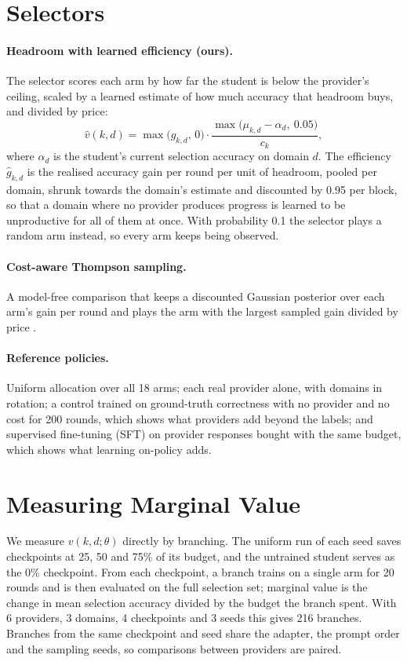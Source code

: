 \section{Selectors}
\label{pre:sec:selectors}

\paragraph{Headroom with learned efficiency (ours).} The selector scores each arm by how
far the student is below the provider's ceiling, scaled by a learned estimate of how much
accuracy that headroom buys, and divided by price:
\[
  \hat{v}(k, d) = \max\big(\hat{g}_{k,d},\, 0\big) \cdot
                  \frac{\max\big(\mu_{k,d} - \alpha_d,\ 0.05\big)}{c_k},
\]
where $\alpha_d$ is the student's current selection accuracy on domain $d$. The efficiency
$\hat{g}_{k,d}$ is the realised accuracy gain per round per unit of headroom, pooled per
domain, shrunk towards the domain's estimate and discounted by 0.95 per block, so that a
domain where no provider produces progress is learned to be unproductive for all of them at
once. With probability 0.1 the selector plays a random arm instead, so every arm keeps
being observed.

\paragraph{Cost-aware Thompson sampling.} A model-free comparison that keeps a discounted
Gaussian posterior over each arm's gain per round and plays the arm with the largest
sampled gain divided by price \autocite{xia_budgeted_ts_2015,raj_dts_2017}.

\paragraph{Reference policies.} Uniform allocation over all 18 arms; each real provider
alone, with domains in rotation; a control trained on ground-truth correctness with no
provider and no cost for 200 rounds, which shows what providers add beyond the labels; and
supervised fine-tuning (SFT) on provider responses bought with the same budget, which shows
what learning on-policy adds.

\section{Measuring Marginal Value}
\label{pre:sec:branching}

We measure $v(k, d; \theta)$ directly by branching. The uniform run of each seed saves
checkpoints at 25, 50 and 75\% of its budget, and the untrained student serves as the 0\%
checkpoint. From each checkpoint, a branch trains on a single arm for 20 rounds and is then
evaluated on the full selection set; marginal value is the change in mean selection
accuracy divided by the budget the branch spent. With 6 providers, 3 domains, 4 checkpoints
and 3 seeds this gives 216 branches. Branches from the same checkpoint and seed share the
adapter, the prompt order and the sampling seeds, so comparisons between providers are
paired.

